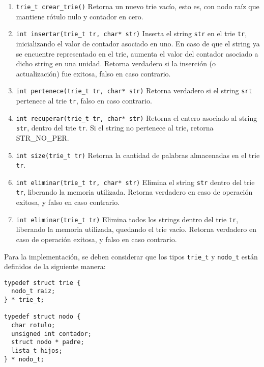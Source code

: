 \documentclass[12pt,a4paper]{article}
\begin{document}
\begin{enumerate}
	
	\item \texttt{trie\_t crear\_trie()} Retorna un nuevo trie vacío, esto es, con nodo raíz que mantiene rótulo nulo y contador en cero.
	
	\item \texttt{int insertar(trie\_t tr, char* str)} Inserta el string \texttt{str} en el trie \texttt{tr}, inicializando el valor de contador asociado en uno. En caso de que el string ya se encuentre representado en el trie, aumenta el valor del contador asociado a dicho string en una unidad. Retorna verdadero si la inserción (o actualización) fue exitosa, falso en caso contrario.

	\item \texttt{int pertenece(trie\_t tr, char* str)} Retorna verdadero si el string \texttt{srt} pertenece al trie \texttt{tr}, falso en caso contrario.
	
	\item \texttt{int recuperar(trie\_t tr, char* str)} Retorna el entero asociado al string \texttt{str}, dentro del trie \texttt{tr}. Si el string no pertenece al trie, retorna STR\_NO\_PER.

	\item \texttt{int size(trie\_t tr)} Retorna la cantidad de palabras almacenadas en el trie \texttt{tr}.
	
	\item \texttt{int eliminar(trie\_t tr, char* str)} Elimina el string \texttt{str} dentro del trie \texttt{tr}, liberando la memoria utilizada. Retorna verdadero en caso de operación exitosa, y falso en caso contrario.
		
	\item \texttt{int eliminar(trie\_t tr)} Elimina todos los strings dentro del trie \texttt{tr}, liberando la memoria utilizada, quedando el trie vacío. Retorna verdadero en caso de operación exitosa, y falso en caso contrario.
	
\end{enumerate}

Para la implementación, se deben considerar que los tipos \texttt{trie\_t} y \texttt{nodo\_t} están definidos de la siguiente manera:

\begin{verbatim}
typedef struct trie {
  nodo_t raiz;
} * trie_t;

typedef struct nodo {
  char rotulo;
  unsigned int contador;
  struct nodo * padre;
  lista_t hijos;
} * nodo_t;

\end{verbatim}
\end{document}
